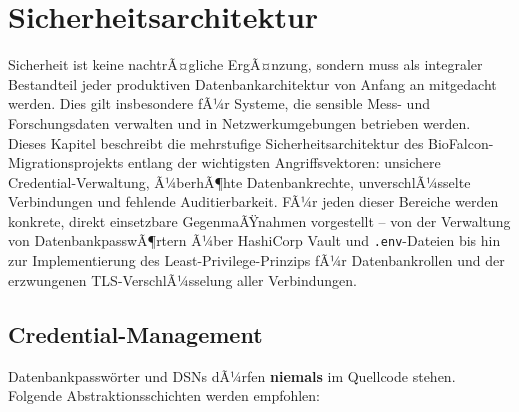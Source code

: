 ﻿\documentclass[12pt,a4paper]{report}
\theoremstyle{definition}
\theoremstyle{remark}
\newcommand{\code}[1]{\texttt{#1}}
\begin{document}
\chapter{Sicherheitsarchitektur}
\label{sec:security}

Sicherheit ist keine nachtrÃ¤gliche ErgÃ¤nzung, sondern muss als integraler Bestandteil jeder produktiven Datenbankarchitektur von Anfang an mitgedacht werden. Dies gilt insbesondere fÃ¼r Systeme, die sensible Mess- und Forschungsdaten verwalten und in Netzwerkumgebungen betrieben werden. Dieses Kapitel beschreibt die mehrstufige Sicherheitsarchitektur des BioFalcon-Migrationsprojekts entlang der wichtigsten Angriffsvektoren: unsichere Credential-Verwaltung, Ã¼berhÃ¶hte Datenbankrechte, unverschlÃ¼sselte Verbindungen und fehlende Auditierbarkeit. FÃ¼r jeden dieser Bereiche werden konkrete, direkt einsetzbare GegenmaÃŸnahmen vorgestellt -- von der Verwaltung von DatenbankpasswÃ¶rtern Ã¼ber HashiCorp Vault und \code{.env}-Dateien bis hin zur Implementierung des Least-Privilege-Prinzips fÃ¼r Datenbankrollen und der erzwungenen TLS-VerschlÃ¼sselung aller Verbindungen.

\section{Credential-Management}

Datenbankpassw\"orter und DSNs dÃ¼rfen \textbf{niemals} im Quellcode
stehen. Folgende Abstraktionsschichten werden empfohlen:
\end{document}
